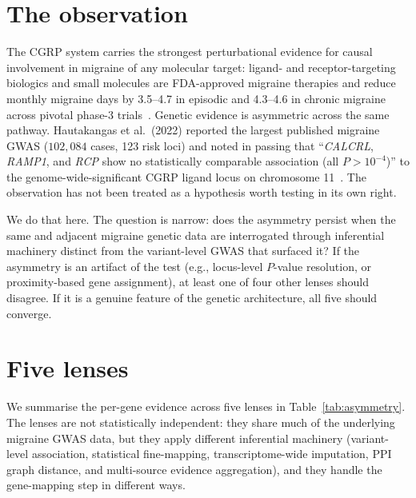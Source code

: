 \documentclass[11pt]{article}
\begin{document}
\section{The observation}

The CGRP system carries the strongest perturbational evidence for causal involvement in migraine of any molecular target: ligand- and receptor-targeting biologics and small molecules are FDA-approved migraine therapies and reduce monthly migraine days by 3.5--4.7 in episodic and 4.3--4.6 in chronic migraine across pivotal phase-3 trials~\cite{goadsby_2017_strive_erenumab,croop_2019_rimegepant,ailani_2021_advance_atogepant,edvinsson_2018_cgrp_review}. Genetic evidence is asymmetric across the same pathway. Hautakangas et al.\ (2022) reported the largest published migraine GWAS ($102{,}084$ cases, 123 risk loci) and noted in passing that ``\textit{CALCRL}, \textit{RAMP1}, and \textit{RCP} show no statistically comparable association (all $P > 10^{-4}$)'' to the genome-wide-significant CGRP ligand locus on chromosome 11~\cite{hautakangas_2022_migraine_gwas}. The observation has not been treated as a hypothesis worth testing in its own right.

We do that here. The question is narrow: does the asymmetry persist when the same and adjacent migraine genetic data are interrogated through inferential machinery distinct from the variant-level GWAS that surfaced it? If the asymmetry is an artifact of the test (e.g., locus-level $P$-value resolution, or proximity-based gene assignment), at least one of four other lenses should disagree. If it is a genuine feature of the genetic architecture, all five should converge.

\section{Five lenses}

We summarise the per-gene evidence across five lenses in Table~\ref{tab:asymmetry}. The lenses are not statistically independent: they share much of the underlying migraine GWAS data, but they apply different inferential machinery (variant-level association, statistical fine-mapping, transcriptome-wide imputation, PPI graph distance, and multi-source evidence aggregation), and they handle the gene-mapping step in different ways.
\end{document}
